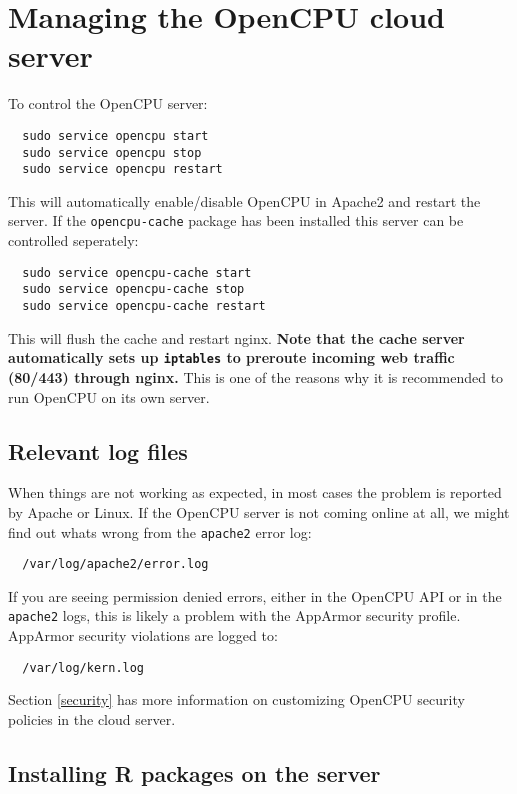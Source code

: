\documentclass{scrartcl}\usepackage[]{graphicx}\usepackage[]{color}
\begin{document}
\section{Managing the OpenCPU cloud server}

To control the OpenCPU server:
\begin{verbatim}
  sudo service opencpu start
  sudo service opencpu stop
  sudo service opencpu restart
\end{verbatim}
This will automatically enable/disable OpenCPU in Apache2 and restart the server. If the \texttt{opencpu-cache} package has been installed this server can be controlled seperately:
\begin{verbatim}
  sudo service opencpu-cache start
  sudo service opencpu-cache stop
  sudo service opencpu-cache restart
\end{verbatim}
This will flush the cache and restart nginx. \textbf{Note that the cache server automatically sets up \texttt{iptables} to preroute incoming web traffic (80/443) through nginx.} This is one of the reasons why it is recommended to run OpenCPU on its own server.

\subsection{Relevant log files}

When things are not working as expected, in most cases the problem is reported by Apache or Linux. If the OpenCPU server is not coming online at all, we might find out whats wrong from the \texttt{apache2} error log:

\begin{verbatim}
  /var/log/apache2/error.log
\end{verbatim}
If you are seeing permission denied errors, either in the OpenCPU API or in the \texttt{apache2} logs, this is likely a problem with the AppArmor security profile. AppArmor security violations are logged to:

\begin{verbatim}
  /var/log/kern.log
\end{verbatim}
Section \ref{security} has more information on customizing OpenCPU security policies in the cloud server. 

\subsection{Installing R packages on the server}
\end{document}
